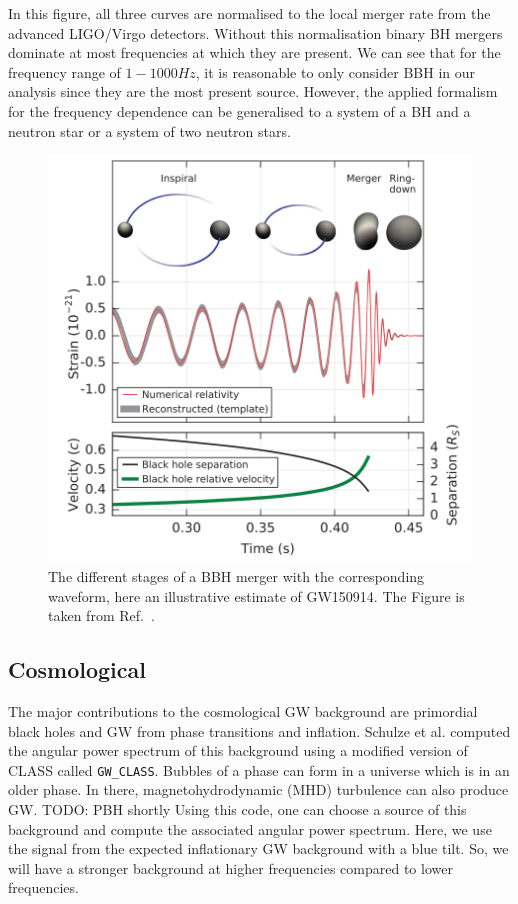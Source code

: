 In this figure, all three curves are normalised to the local merger rate from the advanced LIGO/Virgo detectors. Without this normalisation binary BH mergers dominate at most frequencies at which they are present. We can see that for the frequency range of $1-1000 Hz$, it is reasonable to only consider BBH in our analysis since they are the most present source. However, the applied formalism for the frequency dependence can be generalised to a system of a BH and a neutron star or a system of two neutron stars.

\begin{figure}[h]
    \centering
    \includegraphics[width=0.7\linewidth]{Images/waveform_abbott_complete.png}
    \caption[The different stages of a BBH merger with the corresponding waveform.]{The different stages of a BBH merger with the corresponding waveform, here an illustrative estimate of GW150914. The Figure is taken from Ref.\ \cite{abbott_observation_2016}.}
    \label{GW_waveform}
\end{figure} 

\subsection{Cosmological}
\label{cosmo_bg}
The major contributions to the cosmological GW background are primordial
black holes and GW from phase transitions and inflation.
Schulze et al. \cite{schulze_gw_class_2023} computed the angular power spectrum of this background using a modified version of CLASS \cite{blas_cosmic_2011} called {\tt GW\_CLASS}.
Bubbles of a phase can form in a universe which is in an older phase. In there, magnetohydrodynamic (MHD) turbulence can also produce GW.
TODO: PBH shortly
Using this code, one can choose a source of this background and compute the associated angular power spectrum. Here, we use the signal from the expected inflationary GW background with a blue tilt. So, we will have a stronger background at higher frequencies compared to lower frequencies. 

